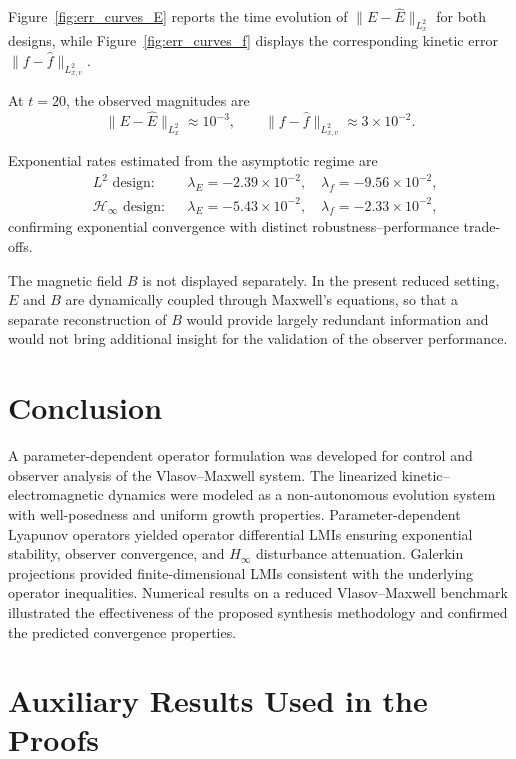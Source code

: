 \documentclass[AMA,Times2COL]{WileyNJDv5}
\begin{document}
Figure~\ref{fig:err_curves_E} reports the time evolution of
$\|E-\hat E\|_{L^2_x}$ for both designs, while Figure~\ref{fig:err_curves_f} displays the corresponding kinetic error $\|f-\hat f\|_{L^2_{x,v}}$.

At $t=20$, the observed magnitudes are
\[
\|E-\hat E\|_{L^2_x}\approx10^{-3},\qquad
\|f-\hat f\|_{L^2_{x,v}}\approx3\times10^{-2}.
\]

Exponential rates estimated from the asymptotic regime are
\[
\begin{aligned}
&\text{$L^2$ design:} && \lambda_E=-2.39\times10^{-2},\quad \lambda_f=-9.56\times10^{-2},\\
&\mathcal{H}_\infty\text{ design:} && \lambda_E=-5.43\times10^{-2},\quad \lambda_f=-2.33\times10^{-2},
\end{aligned}
\]
confirming exponential convergence with distinct robustness--performance trade-offs.

\begin{remark}
The magnetic field $B$ is not displayed separately. In the present reduced setting, $E$ and $B$ are dynamically coupled through Maxwell's equations, so that a separate reconstruction of $B$ would provide largely redundant
information and would not bring additional insight for the validation of the observer performance.
\end{remark}

\section{Conclusion}
\label{sec:conclusion}

A parameter-dependent operator formulation was developed for control and observer analysis of the Vlasov--Maxwell system.
The linearized kinetic--electromagnetic dynamics were modeled as a non-autonomous evolution system with well-posedness and uniform growth properties.
Parameter-dependent Lyapunov operators yielded operator differential LMIs ensuring exponential stability, observer convergence, and $H_\infty$ disturbance attenuation.
Galerkin projections provided finite-dimensional LMIs consistent with the underlying operator inequalities.
Numerical results on a reduced Vlasov--Maxwell benchmark illustrated the effectiveness of the proposed synthesis methodology and confirmed the predicted convergence properties.

\appendix

\section{Auxiliary Results Used in the Proofs}
\label{app:auxiliary}
\end{document}
